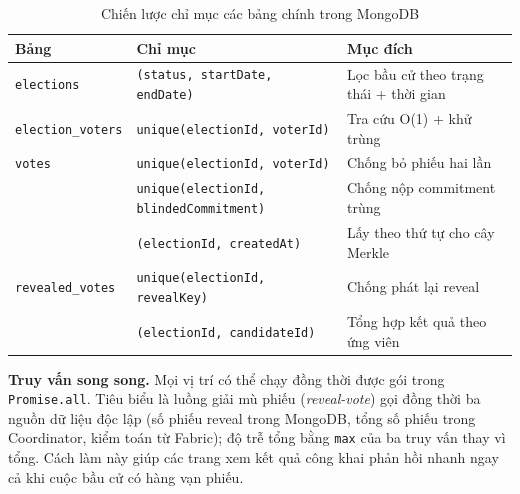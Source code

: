 \begin{table}[H]
\centering
\caption{Chiến lược chỉ mục các bảng chính trong MongoDB}
\label{tab:mongo-index}
\begin{tabularx}{\textwidth}{|L{0.3}|L{0.4}|L{0.3}|}
\hline
\textbf{Bảng} & \textbf{Chỉ mục} & \textbf{Mục đích} \\
\hline
\texttt{elections} & \texttt{(status, startDate, endDate)} & Lọc bầu cử theo trạng thái + thời gian \\
\hline
\texttt{election\_voters} & \texttt{unique(electionId, voterId)} & Tra cứu O(1) + khử trùng \\
\hline
\texttt{votes} & \texttt{unique(electionId, voterId)} & Chống bỏ phiếu hai lần \\
 & \texttt{unique(electionId, blindedCommitment)} & Chống nộp commitment trùng \\
 & \texttt{(electionId, createdAt)} & Lấy theo thứ tự cho cây Merkle \\
\hline
\texttt{revealed\_votes} & \texttt{unique(electionId, revealKey)} & Chống phát lại reveal \\
 & \texttt{(electionId, candidateId)} & Tổng hợp kết quả theo ứng viên \\
\hline
\end{tabularx}
\end{table}

\textbf{Truy vấn song song.} Mọi vị trí có thể chạy đồng thời được gói trong \texttt{Promise.all}. Tiêu biểu là luồng giải mù phiếu (\textit{reveal-vote}) gọi đồng thời ba nguồn dữ liệu độc lập (số phiếu reveal trong MongoDB, tổng số phiếu trong Coordinator, kiểm toán từ Fabric); độ trễ tổng bằng \texttt{max} của ba truy vấn thay vì tổng. Cách làm này giúp các trang xem kết quả công khai phản hồi nhanh ngay cả khi cuộc bầu cử có hàng vạn phiếu.
